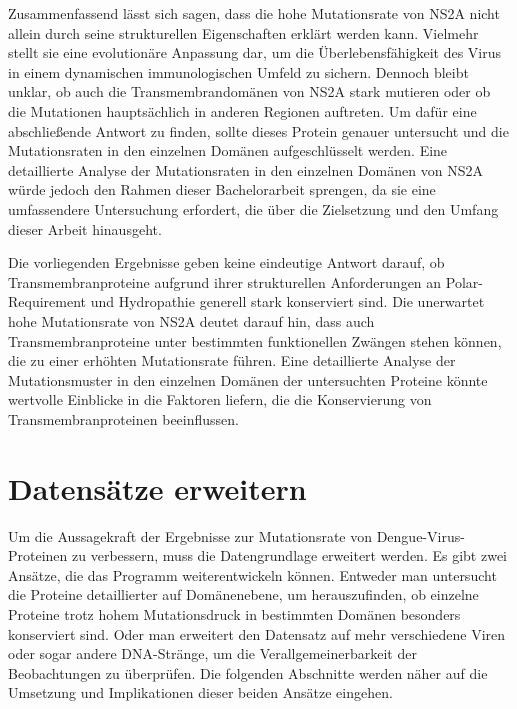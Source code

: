 \documentclass[german,version-2022-01]{uzl-thesis}
\begin{document}
Zusammenfassend l\"asst sich sagen, dass die hohe Mutationsrate von NS2A nicht allein durch seine strukturellen Eigenschaften erkl\"art werden kann. Vielmehr stellt sie eine evolution\"are Anpassung dar, um die \"Uberlebensf\"ahigkeit des Virus in einem dynamischen immunologischen Umfeld zu sichern. Dennoch bleibt unklar, ob auch die Transmembrandom\"anen von NS2A stark mutieren oder ob die Mutationen haupts\"achlich in anderen Regionen auftreten. Um daf\"ur eine abschlie\ss{}ende Antwort zu finden, sollte dieses Protein genauer untersucht und die Mutationsraten in den einzelnen Dom\"anen aufgeschl\"usselt werden. Eine detaillierte Analyse der Mutationsraten in den einzelnen Dom\"anen von NS2A w\"urde jedoch den Rahmen dieser Bachelorarbeit sprengen, da sie eine umfassendere Untersuchung erfordert, die \"uber die Zielsetzung und den Umfang dieser Arbeit hinausgeht.

Die vorliegenden Ergebnisse geben keine eindeutige Antwort darauf, ob Transmembranproteine aufgrund ihrer strukturellen Anforderungen an Polar-Requirement und Hydropathie generell stark konserviert sind. Die unerwartet hohe Mutationsrate von NS2A deutet darauf hin, dass auch Transmembranproteine unter bestimmten funktionellen Zw\"angen stehen k\"onnen, die zu einer erh\"ohten Mutationsrate f\"uhren. Eine detaillierte Analyse der Mutationsmuster in den einzelnen Dom\"anen der untersuchten Proteine k\"onnte wertvolle Einblicke in die Faktoren liefern, die die Konservierung von Transmembranproteinen beeinflussen.

\section{Datens\"atze erweitern}
Um die Aussagekraft der Ergebnisse zur Mutationsrate von Dengue-Virus-Proteinen zu verbessern, muss die Datengrundlage erweitert werden. Es gibt zwei Ans\"atze, die das Programm weiterentwickeln k\"onnen. Entweder man untersucht die Proteine detaillierter auf Dom\"anenebene, um herauszufinden, ob einzelne Proteine trotz hohem Mutationsdruck in bestimmten Dom\"anen besonders konserviert sind. Oder man erweitert den Datensatz auf mehr verschiedene Viren oder sogar andere DNA-Str\"ange, um die Verallgemeinerbarkeit der Beobachtungen zu \"uberpr\"ufen. Die folgenden Abschnitte werden n\"aher auf die Umsetzung und Implikationen dieser beiden Ans\"atze eingehen.
\end{document}
